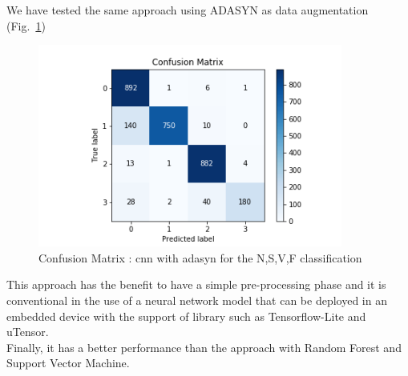 \documentclass[LaM,binding=0.6cm]{sapthesis}
\begin{document}
We have tested the same approach using ADASYN as data augmentation (Fig.~\ref{fig:cnn2})
\begin{figure}[H]  \centering
	\includegraphics[width=100mm,scale=0.7]{cnn-adasyn.png}
	\caption{Confusion Matrix : cnn with adasyn for the N,S,V,F classification}
	\label{fig:cnn2}
\end{figure}
This approach has the benefit to have a simple pre-processing phase and it is conventional in the use of a neural network model that can be deployed in an embedded device with the support of library such as Tensorflow-Lite and uTensor.\\Finally, it has a better performance than the approach with Random Forest and Support Vector Machine.
\end{document}
